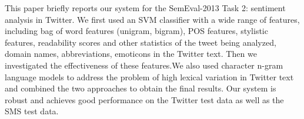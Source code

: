 This paper briefly reports our system for the SemEval-2013 Task 2: sentiment analysis in Twitter. We first used an SVM classifier with  a wide range of
 features, including bag of word features (unigram, bigram), POS features,
 stylistic features,  readability scores and other statistics of the tweet being
 analyzed, domain names, abbreviations, emoticons in the Twitter text. Then we
 investigated the effectiveness of these features.We also used character n-gram
 language models to address the problem of high lexical variation in Twitter
 text and combined the two approaches to obtain the final results. Our system is
 robust and achieves good performance on the Twitter test data as well as the
 SMS test data.

